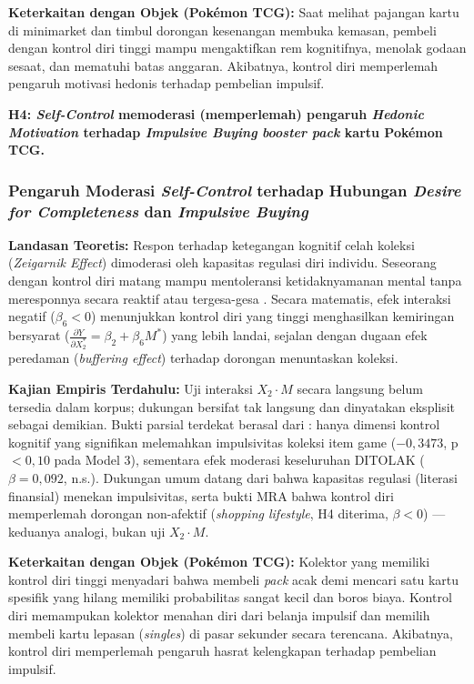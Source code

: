 \documentclass[12pt,a4paper]{article}
\numberwithin{equation}{section}
\numberwithin{table}{section}
\numberwithin{figure}{section}
\begin{document}
\noindent\textbf{Keterkaitan dengan Objek (Pok\'emon TCG):} Saat melihat pajangan kartu di minimarket dan timbul dorongan kesenangan membuka kemasan, pembeli dengan kontrol diri tinggi mampu mengaktifkan rem kognitifnya, menolak godaan sesaat, dan mematuhi batas anggaran. Akibatnya, kontrol diri memperlemah pengaruh motivasi hedonis terhadap pembelian impulsif.

\vspace{0.2cm}
\textbf{H4: \emph{Self-Control} memoderasi (memperlemah) pengaruh \emph{Hedonic Motivation} terhadap \emph{Impulsive Buying} \emph{booster pack} kartu Pok\'emon TCG.}

\subsubsection{Pengaruh Moderasi \emph{Self-Control} terhadap Hubungan \emph{Desire for Completeness} dan \emph{Impulsive Buying}}

\noindent\textbf{Landasan Teoretis:} Respon terhadap ketegangan kognitif celah koleksi (\emph{Zeigarnik Effect}) dimoderasi oleh kapasitas regulasi diri individu. Seseorang dengan kontrol diri matang mampu mentoleransi ketidaknyamanan mental tanpa meresponnya secara reaktif atau tergesa-gesa \citep{tangney2004high, baumeister2002yield}. Secara matematis, efek interaksi negatif ($\beta_6 < 0$) menunjukkan kontrol diri yang tinggi menghasilkan kemiringan bersyarat ($\frac{\partial Y}{\partial X_2^*} = \beta_2 + \beta_6 M^*$) yang lebih landai, sejalan dengan dugaan efek peredaman (\emph{buffering effect}) terhadap dorongan menuntaskan koleksi.

\noindent\textbf{Kajian Empiris Terdahulu:} Uji interaksi $X_2 \cdot M$ secara langsung belum tersedia dalam korpus; dukungan bersifat tak langsung dan dinyatakan eksplisit sebagai demikian. Bukti parsial terdekat berasal dari \citet{artadita2024how}: hanya dimensi kontrol kognitif yang signifikan melemahkan impulsivitas koleksi item game ($-0{,}3473$, p$<0{,}10$ pada Model 3), sementara efek moderasi keseluruhan DITOLAK ($\beta=0{,}092$, n.s.). Dukungan umum datang dari \citet{katauke2023financial} bahwa kapasitas regulasi (literasi finansial) menekan impulsivitas, serta bukti MRA \citet{apidana2022peran} bahwa kontrol diri memperlemah dorongan non-afektif (\emph{shopping lifestyle}, H4 diterima, $\beta<0$) — keduanya analogi, bukan uji $X_2 \cdot M$.

\noindent\textbf{Keterkaitan dengan Objek (Pok\'emon TCG):} Kolektor yang memiliki kontrol diri tinggi menyadari bahwa membeli \emph{pack} acak demi mencari satu kartu spesifik yang hilang memiliki probabilitas sangat kecil dan boros biaya. Kontrol diri memampukan kolektor menahan diri dari belanja impulsif dan memilih membeli kartu lepasan (\emph{singles}) di pasar sekunder secara terencana. Akibatnya, kontrol diri memperlemah pengaruh hasrat kelengkapan terhadap pembelian impulsif.
\end{document}
